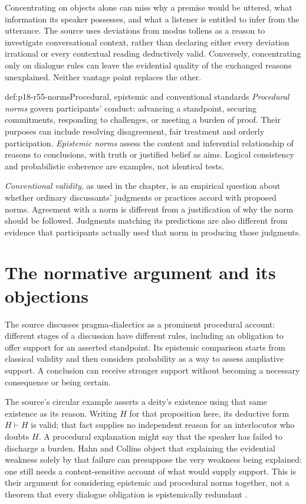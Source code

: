 Concentrating on objects alone can miss why a premise would be uttered,
what information its speaker possesses, and what a listener is entitled
to infer from the utterance. The source uses deviations from modus
tollens as a reason to investigate conversational context, rather than
declaring either every deviation irrational or every contextual reading
deductively valid. Conversely, concentrating only on dialogue rules
can leave the evidential quality of the exchanged reasons unexplained.
Neither vantage point replaces the other.

\begin{hbdefinition}{def:p18-r55-norms}{Procedural, epistemic and conventional standards}
\emph{Procedural norms} govern participants' conduct: advancing a
standpoint, securing commitments, responding to challenges, or meeting
a burden of proof. Their purposes can include resolving disagreement,
fair treatment and orderly participation. \emph{Epistemic norms}
assess the content and inferential relationship of reasons to conclusions,
with truth or justified belief as aims. Logical consistency and
probabilistic coherence are examples, not identical tests.

\emph{Conventional validity}, as used in the chapter, is an empirical
question about whether ordinary discussants' judgments or practices
accord with proposed norms. Agreement with a norm is different from
a justification of why the norm should be followed. Judgments matching
its predictions are also different from evidence that participants
actually used that norm in producing those judgments.
\cite[pp.~362--363]{HahnCollins2021ArgumentationTheory}
\end{hbdefinition}

\section{The normative argument and its objections}
\label{sec:p18-r55-normative-argument}

The source discusses pragma-dialectics as a prominent procedural account:
different stages of a discussion have different rules, including an
obligation to offer support for an asserted standpoint. Its epistemic
comparison starts from classical validity and then considers probability
as a way to assess ampliative support. A conclusion can receive stronger
support without becoming a necessary consequence or being certain.

The source's circular example asserts a deity's existence using that
same existence as its reason. Writing \(H\) for that proposition here,
its deductive form \(H\vdash H\)
is valid; that fact supplies no independent reason for an interlocutor
who doubts \(H\). A procedural explanation might say that the speaker
has failed to discharge a burden. Hahn and Collins object that explaining
the evidential weakness solely by that failure can presuppose the very
weakness being explained: one still needs a content-sensitive account
of what would supply support. This is their argument for considering
epistemic and procedural norms together, not a theorem that every
dialogue obligation is epistemically redundant
\cite[pp.~361--362]{HahnCollins2021ArgumentationTheory}.

